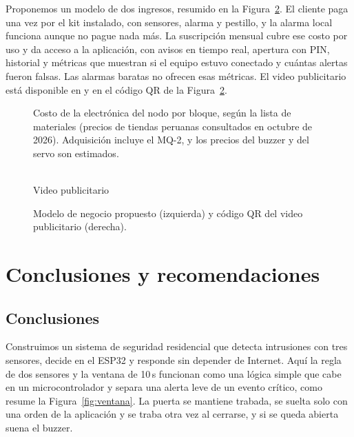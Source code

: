 \documentclass[manuscript,screen,nonacm]{acmart}
\def\videourl{}
\begin{document}
Proponemos un modelo de dos ingresos, resumido en la Figura~\ref{fig:mercado}. El cliente paga una vez por el kit instalado, con sensores, alarma y pestillo, y la alarma local funciona aunque no pague nada más. La suscripción mensual cubre ese costo por uso y da acceso a la aplicación, con avisos en tiempo real, apertura con PIN, historial y métricas que muestran si el equipo estuvo conectado y cuántas alertas fueron falsas. Las alarmas baratas no ofrecen esas métricas. \ifx\videourl\empty\else El video publicitario está disponible en \url{\videourl} y en el código QR de la Figura~\ref{fig:mercado}.\fi

\begin{figure}[htbp]
\centering

\caption{Costo de la electrónica del nodo por bloque, según la lista de materiales (precios de tiendas peruanas consultados en octubre de 2026). Adquisición incluye el MQ-2, y los precios del buzzer y del servo son estimados.}
\label{fig:costos}
\end{figure}

\begin{figure}[htbp]
\centering
\ifx\videourl\empty
{}
\caption{Modelo de negocio propuesto.}
\else
\begin{minipage}[c]{0.78\linewidth}\centering
{}
\end{minipage}\hfill
\begin{minipage}[c]{0.18\linewidth}\centering
\qrcode[height=2.2cm]{\videourl}\\[1mm]
{\scriptsize Video publicitario}
\end{minipage}
\caption{Modelo de negocio propuesto (izquierda) y código QR del video publicitario (derecha).}
\fi
\label{fig:mercado}
\end{figure}

\section{Conclusiones y recomendaciones}
\label{sec:conclusiones}

\subsection{Conclusiones}
Construimos un sistema de seguridad residencial que detecta intrusiones con tres sensores, decide en el ESP32 y responde sin depender de Internet. Aquí la regla de dos sensores y la ventana de 10\,s funcionan como una lógica simple que cabe en un microcontrolador y separa una alerta leve de un evento crítico, como resume la Figura~\ref{fig:ventana}. La puerta se mantiene trabada, se suelta solo con una orden de la aplicación y se traba otra vez al cerrarse, y si se queda abierta suena el buzzer.
\end{document}
